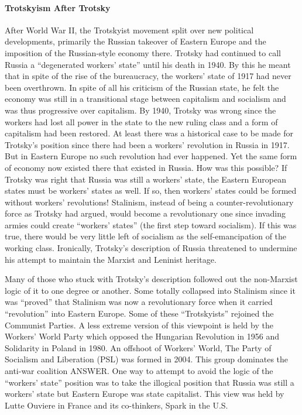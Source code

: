 \paragraph{Trotskyism After Trotsky}

After World War II, the Trotskyist movement split over new political developments, primarily the Russian takeover of Eastern Europe and the imposition of the Russian-style economy there. Trotsky had continued to call Russia a ``degenerated workers' state'' until his death in 1940. By this he meant that in spite of the rise of the bureaucracy, the workers' state of 1917 had never been overthrown. In spite of all his criticism of the Russian state, he felt the economy was still in a transitional stage between capitalism and socialism and was thus progressive over capitalism. By 1940, Trotsky was wrong since the workers had lost all power in the state to the new ruling class and a form of capitalism had been restored. At least there was a historical case to be made for Trotsky's position since there had been a workers' revolution in Russia in 1917. But in Eastern Europe no such revolution had ever happened. Yet the same form of economy now existed there that existed in Russia. How was this possible? If Trotsky was right that Russia was still a workers' state, the Eastern European states must be workers' states as well. If so, then workers' states could be formed without workers' revolutions! Stalinism, instead of being a counter-revolutionary force as Trotsky had argued, would become a revolutionary one since invading armies could create ``workers' states'' (the first step toward socialism). If this was true, there would be very little left of socialism as the self-emancipation of the working class. Ironically, Trotsky's description of Russia threatened to undermine his attempt to maintain the Marxist and Leninist heritage.

Many of those who stuck with Trotsky's description followed out the non-Marxist logic of it to one degree or another. Some totally collapsed into Stalinism since it was ``proved'' that Stalinism was now a revolutionary force when it carried ``revolution'' into Eastern Europe. Some of these ``Trotskyists'' rejoined the Communist Parties. A less extreme version of this viewpoint is held by the Workers' World Party which opposed the Hungarian Revolution in 1956 and Solidarity in Poland in 1980. An offshoot of Workers' World, The Party of Socialism and Liberation (PSL) was formed in 2004. This group dominates the anti-war coalition ANSWER. One way to attempt to avoid the logic of the ``workers' state'' position was to take the illogical position that Russia was still a workers' state but Eastern Europe was state capitalist. This view was held by Lutte Ouviere in France and its co-thinkers, Spark in the U.S.

